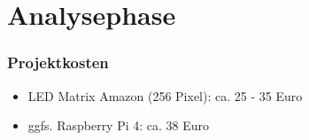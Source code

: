 \clearpage
\section{Analysephase} 
\label{sec:Analysephase}
%
%
%

%
%


\subsubsection{Projektkosten}
\label{sec:Projektkosten}
\begin{itemize}
	\item LED Matrix Amazon (256 Pixel): ca. 25 - 35 Euro
	\item ggfs. Raspberry Pi 4: ca. 38 Euro
\end{itemize}

